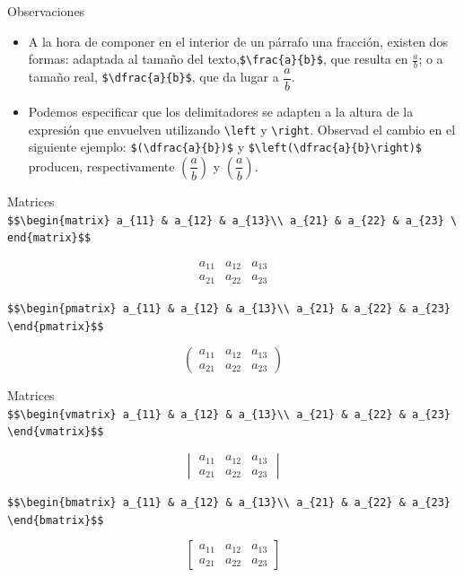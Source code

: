 \documentclass[
  ignorenonframetext,
  aspectratio=169]{beamer}
\begin{document}
\begin{frame}[fragile]{Observaciones}
\label{observaciones}
\begin{itemize}
\item
  A la hora de componer en el interior de un párrafo una fracción,
  existen dos formas: adaptada al tamaño del
  texto,\texttt{\$\textbackslash{}frac\{a\}\{b\}\$}, que resulta en
  \(\frac{a}{b}\); o a tamaño real,
  \texttt{\$\textbackslash{}dfrac\{a\}\{b\}\$}, que da lugar a
  \(\dfrac{a}{b}\).
\item
  Podemos especificar que los delimitadores se adapten a la altura de la
  expresión que envuelven utilizando \texttt{\textbackslash{}left} y
  \texttt{\textbackslash{}right}. Observad el cambio en el siguiente
  ejemplo: \texttt{\$(\textbackslash{}dfrac\{a\}\{b\})\$} y
  \texttt{\$\textbackslash{}left(\textbackslash{}dfrac\{a\}\{b\}\textbackslash{}right)\$}
  producen, respectivamente \((\dfrac{a}{b})\) y
  \(\left(\dfrac{a}{b}\right)\).
\end{itemize}
\end{frame}

\begin{frame}[fragile]{Matrices}
\label{matrices}
\texttt{\$\$\textbackslash{}begin\{matrix\}\ a\_\{11\}\ \&\ a\_\{12\}\ \&\ a\_\{13\}\textbackslash{}\textbackslash{}\ a\_\{21\}\ \&\ a\_\{22\}\ \&\ a\_\{23\}\ \textbackslash{}end\{matrix\}\$\$}

\[\begin{matrix}
a_{11} & a_{12} & a_{13}\\
a_{21} & a_{22} & a_{23}
\end{matrix}\]

\texttt{\$\$\textbackslash{}begin\{pmatrix\}\ a\_\{11\}\ \&\ a\_\{12\}\ \&\ a\_\{13\}\textbackslash{}\textbackslash{}\ a\_\{21\}\ \&\ a\_\{22\}\ \&\ a\_\{23\}\ \textbackslash{}end\{pmatrix\}\$\$}

\[\begin{pmatrix}
a_{11} & a_{12} & a_{13}\\
a_{21} & a_{22} & a_{23}
\end{pmatrix}\]
\end{frame}

\begin{frame}[fragile]{Matrices}
\label{matrices-1}
\texttt{\$\$\textbackslash{}begin\{vmatrix\}\ a\_\{11\}\ \&\ a\_\{12\}\ \&\ a\_\{13\}\textbackslash{}\textbackslash{}\ a\_\{21\}\ \&\ a\_\{22\}\ \&\ a\_\{23\}\ \textbackslash{}end\{vmatrix\}\$\$}

\[\begin{vmatrix}
a_{11} & a_{12} & a_{13}\\
a_{21} & a_{22} & a_{23}
\end{vmatrix}\]

\texttt{\$\$\textbackslash{}begin\{bmatrix\}\ a\_\{11\}\ \&\ a\_\{12\}\ \&\ a\_\{13\}\textbackslash{}\textbackslash{}\ a\_\{21\}\ \&\ a\_\{22\}\ \&\ a\_\{23\}\ \textbackslash{}end\{bmatrix\}\$\$}

\[\begin{bmatrix}
a_{11} & a_{12} & a_{13}\\
a_{21} & a_{22} & a_{23}
\end{bmatrix}\]
\end{frame}
\end{document}
